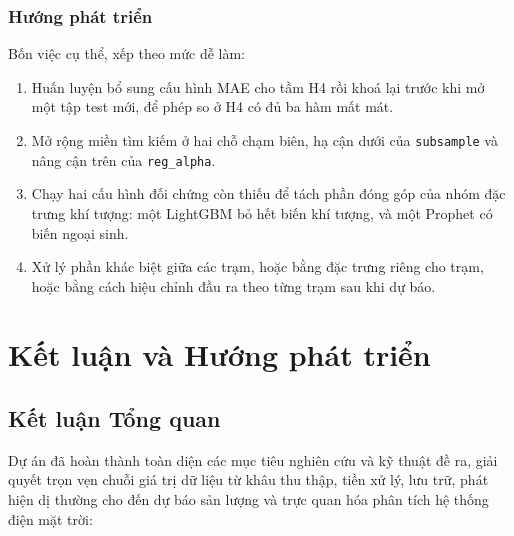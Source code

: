 \documentclass[12pt, a4paper]{report}
\begin{document}
\FloatBarrier
\subsection{Hướng phát triển}

Bốn việc cụ thể, xếp theo mức dễ làm:

\begin{enumerate}
    \item Huấn luyện bổ sung cấu hình MAE cho tầm H4 rồi khoá lại trước khi mở một tập test
    mới, để phép so ở H4 có đủ ba hàm mất mát.
    \item Mở rộng miền tìm kiếm ở hai chỗ chạm biên, hạ cận dưới của \texttt{subsample} và
    nâng cận trên của \texttt{reg\_alpha}.
    \item Chạy hai cấu hình đối chứng còn thiếu để tách phần đóng góp của nhóm đặc trưng khí
    tượng: một LightGBM bỏ hết biến khí tượng, và một Prophet có biến ngoại sinh.
    \item Xử lý phần khác biệt giữa các trạm, hoặc bằng đặc trưng riêng cho trạm, hoặc bằng
    cách hiệu chỉnh đầu ra theo từng trạm sau khi dự báo.
\end{enumerate}


\setcounter{topnumber}{2}
\setcounter{bottomnumber}{1}
\setcounter{totalnumber}{3}
\renewcommand{\topfraction}{0.7}
\renewcommand{\bottomfraction}{0.3}
\renewcommand{\textfraction}{0.2}
\renewcommand{\floatpagefraction}{0.5}

\newpage

\chapter{Kết luận và Hướng phát triển}
\label{chap:conclusion}

\section{Kết luận Tổng quan}
\label{sec:conclusion}
Dự án đã hoàn thành toàn diện các mục tiêu nghiên cứu và kỹ thuật đề ra, giải quyết trọn vẹn chuỗi giá trị dữ liệu từ khâu thu thập, tiền xử lý, lưu trữ, phát hiện dị thường cho đến dự báo sản lượng và trực quan hóa phân tích hệ thống điện mặt trời:
\end{document}
